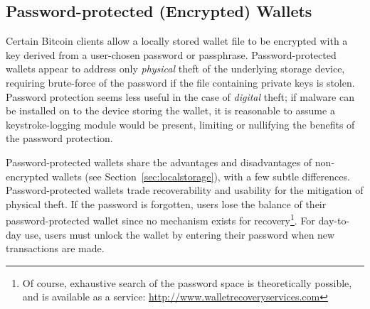 
\subsection{Password-protected (Encrypted) Wallets}
Certain Bitcoin clients allow a locally stored wallet file to be encrypted with a key derived from a user-chosen password or passphrase. 
Password-protected wallets appear to address only \emph{physical} theft of the underlying storage device, requiring brute-force of the password if the file containing private keys is stolen. Password protection seems less useful in the case of \emph{digital} theft; if malware can be installed on to the device storing the wallet, it is reasonable to assume a keystroke-logging module would be present, limiting or nullifying the benefits of the password protection.

Password-protected wallets share the advantages and disadvantages of non-encrypted wallets (see Section~\ref{sec:localstorage}), with a few subtle differences. Password-protected wallets trade recoverability and usability for the mitigation of physical theft. If the password is forgotten, users lose the balance of their password-protected wallet since no mechanism exists for recovery\footnote{Of course, exhaustive search of the password space is theoretically possible, and is available as a service: \url{http://www.walletrecoveryservices.com}}. For day-to-day use, users must unlock the wallet by entering their password when new transactions are made. 

